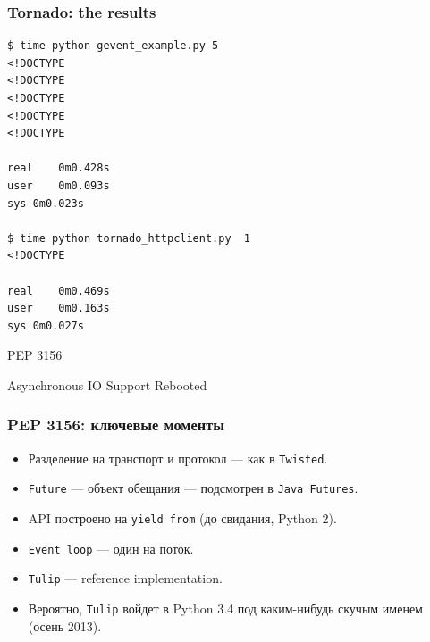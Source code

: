 \documentclass[aspectratio=169]{beamer}
\begin{document}
\begin{frame}[fragile]
  \frametitle{Tornado: the results}
  \begin{lstlisting}
$ time python gevent_example.py 5
<!DOCTYPE 
<!DOCTYPE 
<!DOCTYPE 
<!DOCTYPE 
<!DOCTYPE 

real	0m0.428s
user	0m0.093s
sys	0m0.023s

$ time python tornado_httpclient.py  1
<!DOCTYPE 

real	0m0.469s
user	0m0.163s
sys	0m0.027s
  \end{lstlisting}
\end{frame}


\begin{frame}
  \begin{center}
    {\Huge PEP 3156}

    Asynchronous IO Support Rebooted
  \end{center}
\end{frame}


\begin{frame}
  \frametitle{PEP 3156: ключевые моменты}
  \begin{itemize}
    \item Разделение на транспорт и протокол --- как в {\tt Twisted}.
    \item {\tt Future} --- объект обещания --- подсмотрен в {\tt Java Futures}.
    \item API построено на {\tt yield from} (до свидания, Python 2).
    \item {\tt Event loop} --- один на поток.
    \item {\tt Tulip} --- reference implementation.
    \item Вероятно, {\tt Tulip} войдет в Python 3.4 под каким-нибудь скучым именем (осень 2013).
  \end{itemize}
\end{frame}
\end{document}

